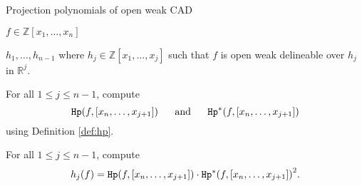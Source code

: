 \documentclass[amsthm]{elsart}
\def  \Hproj {{\tt Hp}}
\def \RR {{\mathbb R}}
\def \ZZ {{\mathbb Z}}
\begin{document}
\begin{algorithm}[!ht]
\caption{{Projection polynomials of open weak CAD}}
\label{alg:openweakcad}
\medskip
\begin{description}[leftmargin=3em,style=nextline,itemsep=0.5em]
\item[\sf In:]   $f\in \ZZ[x_1,\ldots,x_n]$
\item[\sf Out:]  $h_1, \ldots, h_{n-1}$ where $h_j\in \ZZ[x_1,\ldots,x_j]$
such that $f$ is open weak delineable over $h_j$ in $\RR^j$.
\item[\sf 1:]  For all $1\le j\le n-1$, compute
\[
\Hproj(f,[x_n,\ldots,x_{j+1}]) \;\;\;\;\;\; \text{and}\;\;\;\;\;\;
{\Hproj^{\ast}(f,[x_n,\ldots,x_{j+1}])}
\]
using Definition \ref{def:hp}.
\item[\sf 2:]  For all $1\le j \le n-1$, compute       \[h_j(f)=\Hproj(f,[x_n,\ldots,x_{j+1}])\cdot{\Hproj^{\ast}(f,[x_n,\ldots,x_{j+1}])}^2.\]
\end{description}
\end{algorithm}
\end{document}
